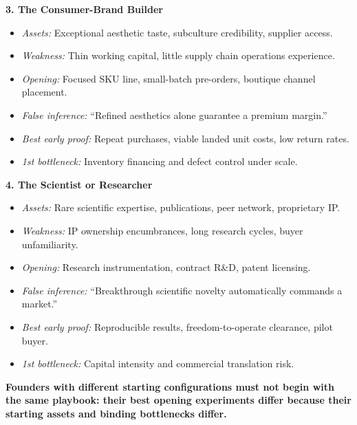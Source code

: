 \textbf{3. The Consumer-Brand Builder}
\begin{itemize}[leftmargin=11pt,itemsep=1pt,topsep=1pt,parsep=0pt]
  \item \textit{Assets:} Exceptional aesthetic taste, subculture credibility, supplier access.
  \item \textit{Weakness:} Thin working capital, little supply chain operations experience.
  \item \textit{Opening:} Focused SKU line, small-batch pre-orders, boutique channel placement.
  \item \textit{False inference:} ``Refined aesthetics alone guarantee a premium margin.''
  \item \textit{Best early proof:} Repeat purchases, viable landed unit costs, low return rates.
  \item \textit{1st bottleneck:} Inventory financing and defect control under scale.
\end{itemize}

\textbf{4. The Scientist or Researcher}
\begin{itemize}[leftmargin=11pt,itemsep=1pt,topsep=1pt,parsep=0pt]
  \item \textit{Assets:} Rare scientific expertise, publications, peer network, proprietary IP.
  \item \textit{Weakness:} IP ownership encumbrances, long research cycles, buyer unfamiliarity.
  \item \textit{Opening:} Research instrumentation, contract R\&D, patent licensing.
  \item \textit{False inference:} ``Breakthrough scientific novelty automatically commands a market.''
  \item \textit{Best early proof:} Reproducible results, freedom-to-operate clearance, pilot buyer.
  \item \textit{1st bottleneck:} Capital intensity and commercial translation risk.
\end{itemize}

\textbf{Founders with different starting configurations must not begin with the same playbook: their best opening experiments differ because their starting assets and binding bottlenecks differ.}
